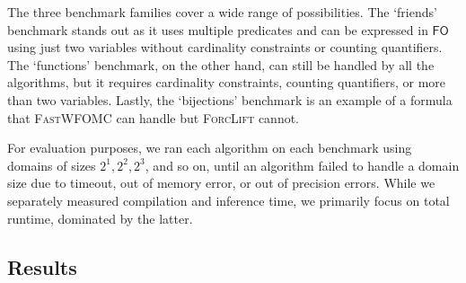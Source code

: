 \documentclass[a4paper,UKenglish,cleveref, autoref, thm-restate]{lipics-v2021}
\newcommand{\FO}{$\mathsf{FO}$}
\begin{document}
The three benchmark families cover a wide range of possibilities. The
`friends' benchmark stands out as it uses multiple predicates and can be
expressed in \FO{} using just two variables without cardinality constraints or
counting quantifiers. The `functions' benchmark, on the other hand, can still be
handled by all the algorithms, but it requires cardinality constraints, counting
quantifiers, or more than two variables. Lastly, the `bijections' benchmark is
an example of a formula that \textsc{FastWFOMC} can handle but \textsc{ForcLift}
cannot.



For evaluation purposes, we ran each algorithm on each benchmark using domains
of sizes $2^{1}, 2^{2}, 2^{3}$, and so on, until an algorithm failed to handle a
domain size due to timeout, out of memory error, or out of precision errors.
While we separately measured compilation and inference time, we primarily focus
on total runtime, dominated by the latter.





\subsection{Results}
\end{document}

